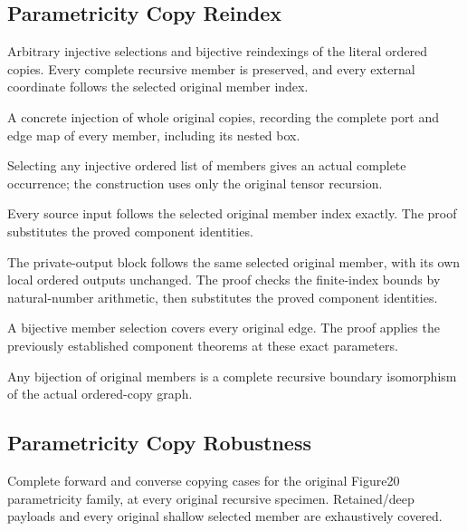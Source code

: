 \subsection{Parametricity Copy Reindex}
Arbitrary injective selections and bijective reindexings of the literal
ordered copies. Every complete recursive member is preserved, and every
external coordinate follows the selected original member index.

A concrete injection of whole original copies, recording the complete
port and edge map of every member, including its nested box.
\par{}

Selecting any injective ordered list of members gives an actual complete
occurrence; the construction uses only the original tensor recursion.
\par{}

Every source input follows the selected original member index exactly.
The proof substitutes the proved component identities.
\par{}

The private-output block follows the same selected original member,
with its own local ordered outputs unchanged.
The proof checks the finite-index bounds by natural-number arithmetic, then substitutes the proved component identities.
\par{}

A bijective member selection covers every original edge.
The proof applies the previously established component theorems at these exact parameters.
\par{}

Any bijection of original members is a complete recursive boundary
isomorphism of the actual ordered-copy graph.
\par{}

\subsection{Parametricity Copy Robustness}
Complete forward and converse copying cases for the original Figure20
parametricity family, at every original recursive specimen. Retained/deep
payloads and every original shallow selected member are exhaustively covered.

